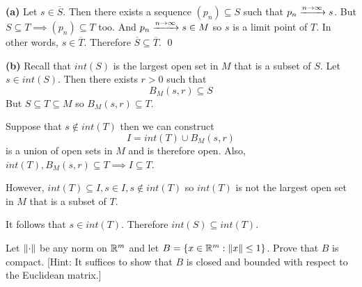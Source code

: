 \documentclass[a4paper, 12pt]{article}
\begin{document}
\begin{solution}
    \textbf{(a)} Let $s \in \overline{S}$. Then there exists a sequence $(p_n) \subseteq S$ such that $p_n \xrightarrow{n \to \infty} s$. But $S \subseteq T \implies (p_n) \subseteq T$ too. And $p_n \xrightarrow{n \to \infty} s \in M$ so $s$ is a limit point of $T$. In other words, $s \in \overline{T}$. Therefore $\overline{S} \subseteq \overline{T}$. \qed

    \textbf{(b)} Recall that $int(S)$ is the largest open set in $M$ that is a subset of $S$. Let $s \in int(S)$. Then there exists $r > 0$ such that \[
        B_M(s, r) \subseteq S
    \]
    But $S \subseteq T \subseteq M$ so $B_M(s, r) \subseteq T$.

    Suppose that $s \not \in int(T)$ then we can construct \[
        I = int(T) \cup B_M(s, r)
    \]
    is a union of open sets in $M$ and is therefore open. Also, $int(T), B_M(s, r) \subseteq T \implies I \subseteq T$.

    However, $int(T) \subseteq I, s \in I, s \not \in int(T)$ so $int(T)$ is not the largest open set in $M$ that is a subset of $T$. \contra

    It follows that $s \in int(T)$. Therefore $int(S) \subseteq int(T)$.
\end{solution}
\begin{problem} 
Let $\lVert\cdot\rVert$ be any norm on $\mathbb{R}^m$ and let $B = \{x \in \mathbb{R}^m : \lVert x\rVert \leq 1\}$. Prove that $B$ is compact. [Hint: It suffices to show that $B$ is closed and bounded with respect to the Euclidean matrix.]
\end{problem}
\end{document}
